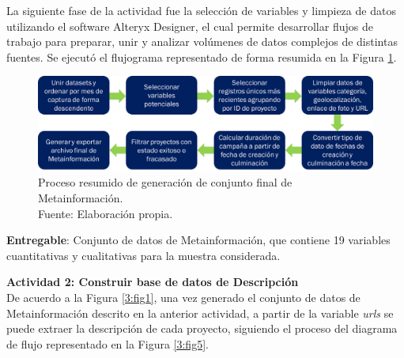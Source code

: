 La siguiente fase de la actividad fue la selección de variables y limpieza de datos utilizando el software Alteryx Designer, el cual permite desarrollar flujos de trabajo para preparar, unir y analizar volúmenes de datos complejos de distintas fuentes. Se ejecutó el flujograma representado de forma resumida en la Figura \ref{3:fig4}.

\begin{figure}[h]
	\begin{center}
		\includegraphics[width=1\textwidth]{3/figures/flujograma_metadata_t3.png}
		\caption[Proceso resumido de generación de conjunto final de Metainformación]{Proceso resumido de generación de conjunto final de Metainformación.\\
			Fuente: Elaboración propia.}
		\label{3:fig4}
	\end{center}
\end{figure}

\textbf{Entregable}: Conjunto de datos de Metainformación, que contiene 19 variables cuantitativas y cualitativas para la muestra considerada.

\textbf{Actividad 2: Construir base de datos de Descripción}
\\
De acuerdo a la Figura \ref{3:fig1}, una vez generado el conjunto de datos de Metainformación descrito en la anterior actividad, a partir de la variable \textit{urls} se puede extraer la descripción de cada proyecto, siguiendo el proceso del diagrama de flujo representado en la Figura \ref{3:fig5}.

